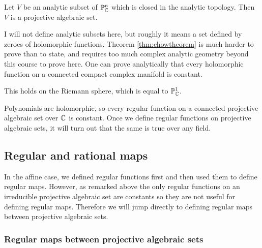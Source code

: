 \begin{theorem}
\label{thm:chowtheorem}
Let $ V $ be an analytic subset of $ \mathbb{P}_{\mathbb{C}}^n $ which is closed in the analytic topology. Then $ V $ is a projective algebraic set.
\end{theorem}

I will not define analytic subsets here, but roughly it means a set defined by zeroes of holomorphic functions. Theorem \ref{thm:chowtheorem} is much harder to prove than to state, and requires too much complex analytic geometry beyond this course to prove here. One can prove analytically that every holomorphic function on a connected compact complex manifold is constant.

\begin{example*}
This holds on the Riemann sphere, which is equal to $ \mathbb{P}_{\mathbb{C}}^1 $.
\end{example*}

Polynomials are holomorphic, so every regular function on a connected projective algebraic set over $ \mathbb{C} $ is constant. Once we define regular functions on projective algebraic sets, it will turn out that the same is true over any field.

\pagebreak

\subsection{Regular and rational maps}

In the affine case, we defined regular functions first and then used them to define regular maps. However, as remarked above the only regular functions on an irreducible projective algebraic set are constants so they are not useful for defining regular maps. Therefore we will jump directly to defining regular maps between projective algebraic sets.

\subsubsection{Regular maps between projective algebraic sets}


